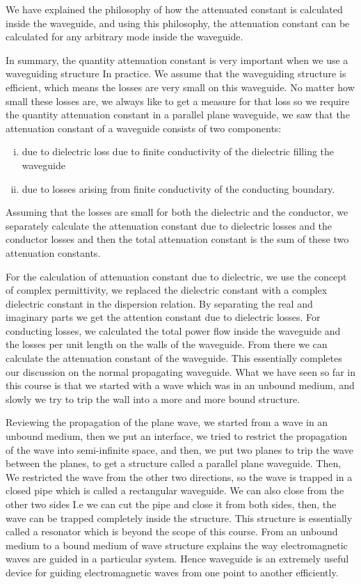 We have explained the philosophy of how the attenuated constant is calculated inside the waveguide, and using this philosophy, the attenuation constant can be calculated for any arbitrary mode inside the waveguide.

In summary, the quantity attenuation constant is very important when we use a waveguiding structure In practice. We assume that the waveguiding structure is efficient, which means the losses are very small on this waveguide.
No matter how small these losses are, we always like to get a measure for that loss so we require the quantity attenuation constant in a parallel plane waveguide, we saw that the attenuation constant of a waveguide consists of two components:
\begin{enumerate}[(i)]
\item due to dielectric loss due to finite conductivity of the dielectric filling the waveguide
\item due to losses arising from finite conductivity of the conducting boundary.
\end{enumerate}
Assuming that the losses are small for both the dielectric and the conductor, we separately calculate the attenuation constant due to dielectric losses and the conductor losses and then the total attenuation constant is the sum of these two attenuation constants.

For the calculation of attenuation constant due to dielectric, we use the concept of complex permittivity, we replaced the dielectric constant with a complex dielectric constant in the dispersion relation. By separating the real and imaginary parts we get the attention constant due to dielectric losses. 
For conducting losses, we calculated the total power flow inside the waveguide and the losses per unit length on the walls of the waveguide. From there we can calculate the attenuation constant of the waveguide. This essentially completes our discussion on the normal propagating waveguide. 
What we have seen so far in this course is that we started with a wave which was in an unbound medium, and slowly we try to trip the wall into a more and more bound structure.

Reviewing the propagation of the plane wave, we started from a wave in an unbound medium, then we put an interface, we tried to restrict the propagation of the wave into semi-infinite space, and then, we put two planes to trip the wave between the planes, to get a structure called a parallel plane waveguide. Then, We restricted the wave from the other two directions, so the wave is trapped in a closed pipe which is called a rectangular waveguide. We can also close from the other two sides I.e we can cut the pipe and close it from both sides, then, the wave can be trapped completely inside the structure. This structure is essentially called a resonator which is beyond the scope of this course. From an unbound medium to a bound medium of wave structure explains the way electromagnetic waves are guided in a particular system. Hence waveguide is an extremely useful device for guiding electromagnetic waves from one point to another efficiently.
